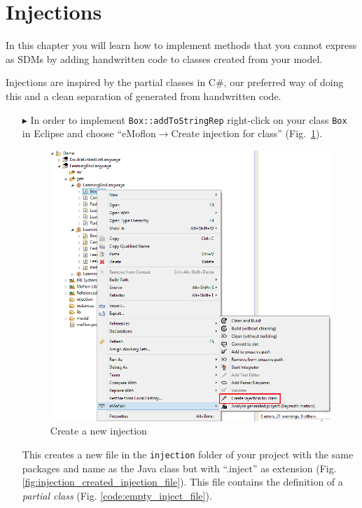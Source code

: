 \section{Injections}
\label{sec:intro_injections}

In this chapter you will learn how to implement methods that you cannot express as SDMs by adding handwritten code to classes created from your model.

Injections are inspired by the partial classes in C\#, our preferred way of doing this and a clean separation of generated from handwritten code.

\begin{enumerate}
    \item[$\blacktriangleright$] In order to implement \texttt{Box::addToStringRep} right-click on your class \texttt{Box} in Eclipse and choose ``eMoflon$\rightarrow$Create injection for class'' (Fig.~\ref{fig:injection_create_injection}).

    \begin{figure}[htbp]
        \centering
        \includegraphics[width=\textwidth]{pics/injectionBilder/create_injection_context_menu.png}
        \caption{Create a new injection}
        \label{fig:injection_create_injection}
    \end{figure}

    This creates a new file in the \texttt{injection} folder of your project with the same packages and name as the Java class but with ``.inject'' as extension (Fig. \ref{fig:injection_created_injection_file}). This file contains the definition of a \textit{partial class} (Fig. \ref{code:empty_inject_file}). 


\end{enumerate}
